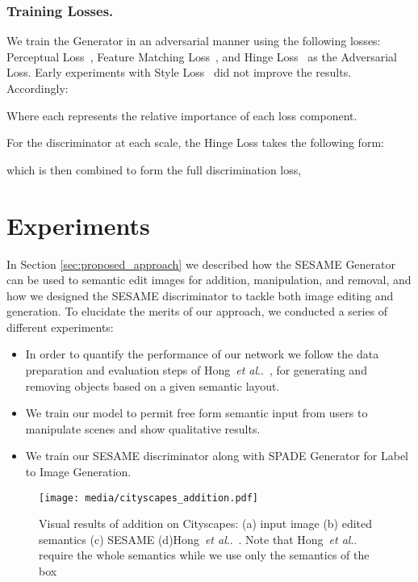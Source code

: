 \documentclass[runningheads]{llncs}
\makeatletter
\DeclareRobustCommand\onedot{\futurelet\@let@token\@onedot}
\def\@onedot{\ifx\@let@token.\else.\null\fi\xspace}
\def\etal{\emph{et al}\onedot}
\def\hong{Hong~\etal~\cite{hong2018learning}}
\makeatother
\begin{document}
\subsubsection{Training Losses.}
We train the Generator in an adversarial manner using the following losses: Perceptual Loss~\cite{Johnson2016Perceptual}, Feature Matching Loss~\cite{NIPS2016_6125}, and Hinge Loss~\cite{lim2017geometric,tranNIPS2017_7136,miyato2018spectral} as the Adversarial Loss.
Early experiments with Style Loss~\cite{Johnson2016Perceptual} did not improve the results.
Accordingly:

Where each  represents the relative importance of each loss component.

For the discriminator at each scale, the Hinge Loss takes the following form: 

which is then combined to form the full discrimination loss,

\label{ss:preparation}


\section{Experiments}
\label{sec:experiments}

In Section \ref{sec:proposed_approach} we described how the SESAME Generator can be used to semantic edit images for addition, manipulation, and removal, and how we designed the SESAME discriminator to tackle both image editing and generation. To elucidate the merits of our approach, we conducted a series of different experiments:
\begin{itemize}
    \item In order to quantify the performance of our network we follow the data preparation and evaluation steps of \hong{}, for generating and removing objects based on a given semantic layout.
    \item We train our model to permit free form semantic input from users to manipulate scenes and show qualitative results.
    \item We train our SESAME discriminator along with SPADE Generator for Label to Image Generation.
\end{itemize}

\begin{figure}[t]
\begin{center}
    \centering
    \texttt{[image: media/cityscapes\_addition.pdf]}
    \caption{Visual results of addition on Cityscapes: (a) input image (b) edited semantics (c) SESAME (d)\hong{}. Note that \hong{} require the whole semantics while we use only the semantics of the box}
    \label{fig:city_results}
\end{center}
\end{figure}
\end{document}
